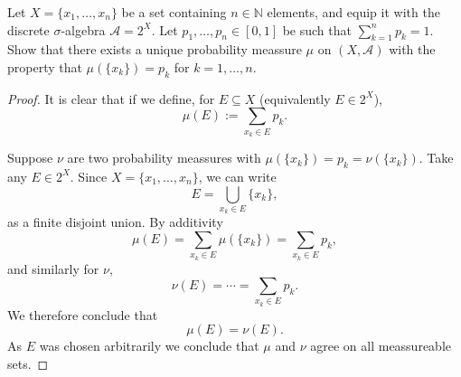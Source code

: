 \begin{prob*}[4]
    Let $X = \{x_1,\ldots,x_n\}$ be a set containing 
    $n \in \mathbb N$ elements, and equip it with the discrete 
    $\sigma$-algebra $\mathcal A = 2^X$. Let $p_1,\ldots,p_n \in [0,1]$
    be such that $\sum_{k=1}^n p_k = 1$. Show that there exists 
    a unique probability meassure $\mu$ on $(X,\mathcal A)$ with 
    the property that $\mu(\{x_k\}) = p_k$ for $k = 1,\ldots,n$.
\end{prob*}
\begin{proof}
    It is clear that if we define, for $E \subseteq X$ (equivalently
    $E \in 2^X$), 
    \[
        \mu(E) := \sum_{x_k \in E} p_k.
    \]
    
    Suppose $\nu$ are two probability meassures with 
    $\mu(\{x_k\}) = p_k = \nu(\{x_k\})$. 
    Take any $E \in 2^X$. Since $X = \{x_1,\ldots,x_n\}$, we can 
    write 
    \[
        E = \bigcup_{x_k \in E} \{x_k\}, 
    \]
    as a finite disjoint union. By additivity 
    \[
        \mu(E) = \sum_{x_k \in E}\mu(\{x_k\}) = \sum_{x_k \in E}p_k,
    \]
    and similarly for $\nu$, 
    \[
        \nu(E) = \cdots = \sum_{x_k \in E}p_k. 
    \]
    We therefore conclude that 
    \[
        \mu(E) = \nu(E).
    \]
    As $E$ was chosen arbitrarily we conclude that $\mu$ and 
    $\nu$ agree on all meassureable sets.
\end{proof}

